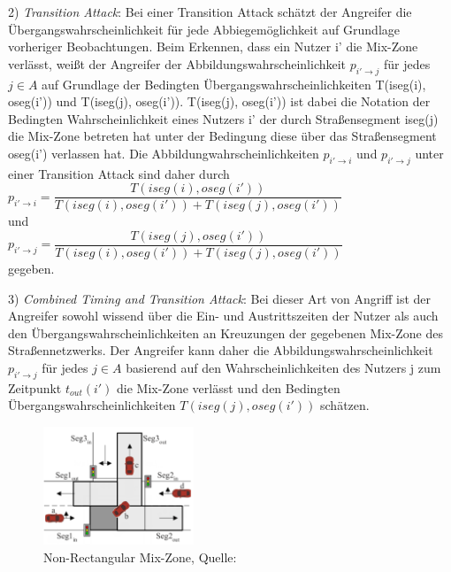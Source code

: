 2)	\textit{Transition Attack}: Bei einer Transition Attack schätzt der Angreifer die Übergangswahrscheinlichkeit für jede Abbiegemöglichkeit auf Grundlage vorheriger Beobachtungen. Beim Erkennen, dass ein Nutzer i' die Mix-Zone verlässt, weißt der Angreifer der Abbildungswahrscheinlichkeit $p_{i'\rightarrow j}$  für jedes $j \in A$ auf Grundlage der Bedingten Übergangswahrscheinlichkeiten T(iseg(i), oseg(i')) und T(iseg(j), oseg(i')).  T(iseg(j), oseg(i')) ist dabei die Notation der Bedingten Wahrscheinlichkeit eines Nutzers i' der durch Straßensegment iseg(j) die Mix-Zone betreten hat unter der Bedingung diese über das Straßensegment oseg(i') verlassen hat. Die Abbildungwahrscheinlichkeiten  $p_{i'\rightarrow i}$ und $p_{i'\rightarrow j}$ unter einer Transition Attack sind daher durch \\
$p_{i'\rightarrow i} = \dfrac{T(iseg(i), oseg(i'))}{T(iseg(i), oseg(i')) + T(iseg(j), oseg(i'))} $\\
 und \\
  $p_{i'\rightarrow j} = \dfrac{T(iseg(j), oseg(i'))}{T(iseg(i), oseg(i')) + T(iseg(j), oseg(i'))} $ \\ gegeben.
  
 3)	\textit{Combined  Timing and Transition Attack}: Bei dieser Art von Angriff ist der Angreifer sowohl wissend über die Ein- und Austrittszeiten der Nutzer als auch den Übergangswahrscheinlichkeiten an Kreuzungen der gegebenen Mix-Zone des Straßennetzwerks. Der Angreifer kann  daher die Abbildungswahrscheinlichkeit $p_{i'\rightarrow j}$ für jedes $j \in A$ basierend auf den Wahrscheinlichkeiten des Nutzers j zum Zeitpunkt $t_{out}(i')$ die Mix-Zone verlässt und den Bedingten Übergangswahrscheinlichkeiten $T(iseg(j), oseg(i'))$ schätzen. 
 
 \begin{figure}[!h]
 	\centering
 	\includegraphics[width=0.4\textwidth]{Bilder/nonrectangularMix.PNG}
 	\caption{Non-Rectangular Mix-Zone, Quelle: \protect\cite{Chow2011}}
 	\label{fig_MixSrasseNon}
 \end{figure}
 
